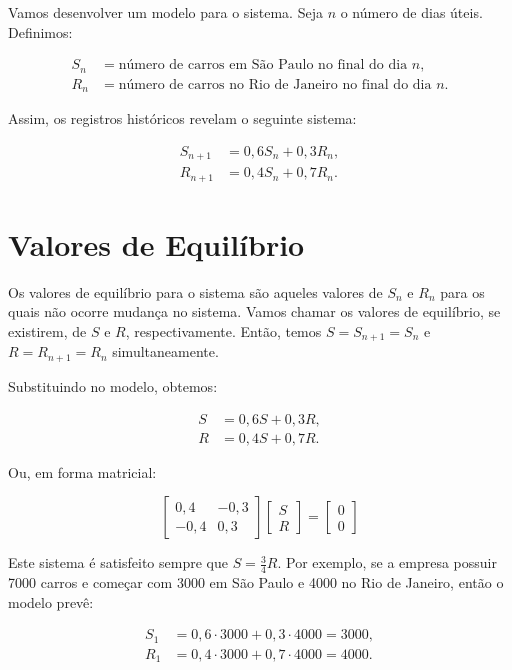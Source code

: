 \documentclass{article}
\begin{document}
Vamos desenvolver um modelo para o sistema. Seja \( n \) o número de
dias úteis. Definimos:

\begin{align*}
  S_n &= \text{número de carros em São Paulo no final do dia } n, \\
  R_n &= \text{número de carros no Rio de Janeiro no final do dia } n.
\end{align*}

Assim, os registros históricos revelam o seguinte sistema:

\begin{align*}
S_{n+1} &= 0{,}6 S_n + 0{,}3 R_n, \\
R_{n+1} &= 0{,}4 S_n + 0{,}7 R_n.
\end{align*}

\section*{Valores de Equilíbrio}

Os valores de equilíbrio para o sistema são aqueles valores de
\( S_n \) e \( R_n \) para os quais não ocorre mudança no
sistema. Vamos chamar os valores de equilíbrio, se existirem, de
\( S \) e \( R \), respectivamente. Então, temos
\( S = S_{n+1} = S_n \) e \( R = R_{n+1} = R_n \) simultaneamente.

Substituindo no modelo, obtemos:

\begin{align*}
S &= 0{,}6 S + 0{,}3 R, \\
R &= 0{,}4 S + 0{,}7 R.
\end{align*}

Ou, em forma matricial:

\[
\begin{bmatrix}
0{,}4 & -0{,}3 \\
-0{,}4 & 0{,}3
\end{bmatrix}
\begin{bmatrix}
S \\ R
\end{bmatrix}
=
\begin{bmatrix}
0 \\ 0
\end{bmatrix}
\]

Este sistema é satisfeito sempre que \( S = \frac{3}{4} R \). Por
exemplo, se a empresa possuir 7000 carros e começar com 3000 em São
Paulo e 4000 no Rio de Janeiro, então o modelo prevê:

\begin{align*}
  S_1 &= 0{,}6 \cdot 3000 + 0{,}3 \cdot 4000 = 3000, \\
  R_1 &= 0{,}4 \cdot 3000 + 0{,}7 \cdot 4000 = 4000.
\end{align*}
\end{document}

